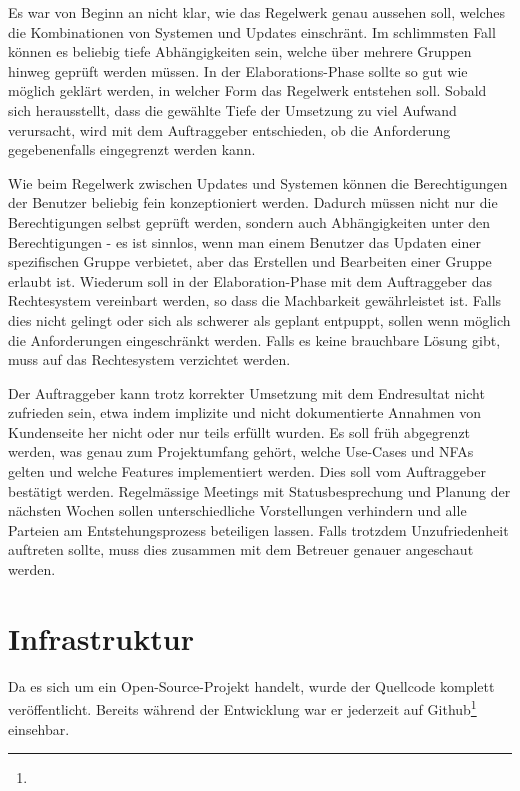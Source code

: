 {Es war von Beginn an nicht klar, wie das Regelwerk genau aussehen soll, welches die Kombinationen von Systemen und Updates einschränt. Im schlimmsten Fall können es beliebig tiefe Abhängigkeiten sein, welche über mehrere Gruppen hinweg geprüft werden müssen.}
{In der Elaborations-Phase sollte so gut wie möglich geklärt werden, in welcher Form das Regelwerk entstehen soll. Sobald sich herausstellt, dass die gewählte Tiefe der Umsetzung zu viel Aufwand verursacht, wird mit dem Auftraggeber entschieden, ob die Anforderung gegebenenfalls eingegrenzt werden kann.}


{Wie beim Regelwerk zwischen Updates und Systemen können die Berechtigungen der Benutzer beliebig fein konzeptioniert werden. Dadurch müssen nicht nur die Berechtigungen selbst geprüft werden, sondern auch Abhängigkeiten unter den Berechtigungen - es ist sinnlos, wenn man einem Benutzer das Updaten einer spezifischen Gruppe verbietet, aber das Erstellen und Bearbeiten einer Gruppe erlaubt ist.}
{Wiederum soll in der Elaboration-Phase mit dem Auftraggeber das Rechtesystem vereinbart werden, so dass die Machbarkeit gewährleistet ist. Falls dies nicht gelingt oder sich als schwerer als geplant entpuppt, sollen wenn möglich die Anforderungen eingeschränkt werden. Falls es keine brauchbare Lösung gibt, muss auf das Rechtesystem verzichtet werden.}


{Der Auftraggeber kann trotz korrekter Umsetzung mit dem Endresultat nicht zufrieden sein, etwa indem implizite und nicht dokumentierte Annahmen von Kundenseite her nicht oder nur teils erfüllt wurden.}
{Es soll früh abgegrenzt werden, was genau zum Projektumfang gehört, welche Use-Cases und NFAs gelten und welche Features implementiert werden. Dies soll vom Auftraggeber bestätigt werden. Regelmässige Meetings mit Statusbesprechung und Planung der nächsten Wochen sollen unterschiedliche Vorstellungen verhindern und alle Parteien am Entstehungsprozess beteiligen lassen. Falls trotzdem Unzufriedenheit auftreten sollte, muss dies zusammen mit dem Betreuer genauer angeschaut werden.}


\section{Infrastruktur}
\label{sec:pm:infrastructure}

Da es sich um ein Open-Source-Projekt handelt, wurde der Quellcode komplett veröffentlicht. Bereits während der Entwicklung war er jederzeit auf Github\footnote{} einsehbar.

